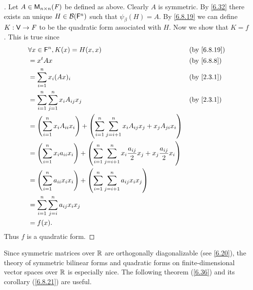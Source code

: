\begin{proof}[]
  Let \(A \in \ms[n][n][\F]\) be defined as above.
  Clearly \(A\) is symmetric.
  By \cref{6.32} there exists an unique \(H \in \mathcal{B}(\mathsf{F}^n)\) such that \(\psi_{\beta}(H) = A\).
  By \cref{6.8.19} we can define \(K : \mathsf{V} \to \mathit{F}\) to be the quadratic form associated with \(H\).
  Now we show that \(K = f\).
  This is true since
  \begin{align*}
     & \forall x \in \vs{F}^n, K(x) = H(x, x)                                                                                               &  & \by{6.8.19} \\
     & = \tp{x} A x                                                                                                                         &  & \by{6.8.8}  \\
     & = \sum_{i = 1}^n x_i (Ax)_{i}                                                                                                        &  & \by{2.3.1}  \\
     & = \sum_{i = 1}^n \sum_{j = 1}^n x_i A_{i j} x_j                                                                                      &  & \by{2.3.1}  \\
     & = \pa{\sum_{i = 1}^n x_i A_{i i} x_i} + \pa{\sum_{i = 1}^n \sum_{j = i + 1}^n x_i A_{i j} x_j + x_j A_{j i} x_i}                                      \\
     & = \pa{\sum_{i = 1}^n x_i a_{i i} x_i} + \pa{\sum_{i = 1}^n \sum_{j = i + 1}^n x_i \frac{a_{i j}}{2} x_j + x_j \frac{a_{i j}}{2} x_i}                  \\
     & = \pa{\sum_{i = 1}^n a_{i i} x_i x_i} + \pa{\sum_{i = 1}^n \sum_{j = i + 1}^n a_{i j} x_i x_j}                                                        \\
     & = \sum_{i = 1}^n \sum_{j = i}^n a_{i j} x_i x_j                                                                                                       \\
     & = f(x).
  \end{align*}
  Thus \(f\) is a quadratic form.
\end{proof}

\begin{note}
  Since symmetric matrices over \(\mathbb{R}\) are orthogonally diagonalizable (see \cref{6.20}), the theory of symmetric bilinear forms and quadratic forms on finite-dimensional vector spaces over \(\mathbb{R}\) is especially nice.
  The following theorem (\cref{6.36}) and its corollary (\cref{6.8.21}) are useful.
\end{note}

